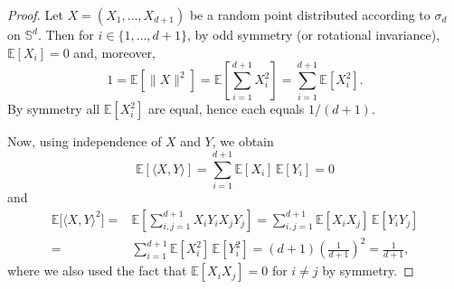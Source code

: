 \documentclass[10pt,a4paper]{amsart}
\begin{document}
\begin{proof}
Let $X=(X_1,\ldots,X_{d+1})$ be a random point distributed according to $\sigma_d$ on $\mathbb{S}^d$. Then for $i\in\{1,\dots,d+1\}$, by odd symmetry (or rotational invariance), $\mathbb{E}[X_i]=0$ and, moreover,
\[
1 = \mathbb{E}[\|X\|^2] = \mathbb{E}\left[\sum_{i=1}^{d+1} X_i^2\right]
= \sum_{i=1}^{d+1} \mathbb{E}[X_i^2].
\]
By symmetry all $\mathbb{E}[X_i^2]$ are equal, hence each equals $1/(d+1)$.

Now, using independence of $X$ and $Y$, we obtain 
\[
\mathbb{E}[\langle X , Y\rangle] = \sum_{i=1}^{d+1} \mathbb{E}[X_i]\,\mathbb{E}[Y_i] = 0
\]
and 
\begin{align*}
\mathbb{E}\bigl[\langle X,Y\rangle^2\bigr]
= & \mathbb{E}\left[\sum_{i,j=1}^{d+1} X_i Y_i X_j Y_j\right]
= \sum_{i,j=1}^{d+1} \mathbb{E}[X_i X_j]\, \mathbb{E}[Y_i Y_j]\\
= & \sum_{i=1}^{d+1} \mathbb{E}[X_i^2]\, \mathbb{E}[Y_i^2]
= (d+1)\left(\frac{1}{d+1}\right)^2
= \frac{1}{d+1},
\end{align*}
where we also used the fact that $\mathbb{E}[X_i X_j]=0$ for $i\neq j$ by symmetry.
\end{proof}
\end{document}
